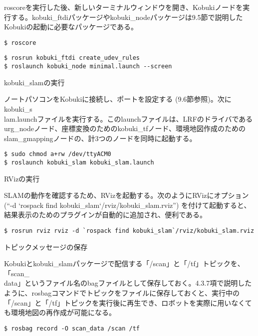roscoreを実行した後、新しいターミナルウィンドウを開き、Kobukiノードを実行する。kobuki\_ftdiパッケージやkobuki\_nodeパッケージは9.5節で説明したKobukiの起動に必要なパッケージである。

\begin{lstlisting}[language=ROS]
$ roscore
\end{lstlisting}

\begin{lstlisting}[language=ROS]
$ rosrun kobuki_ftdi create_udev_rules
$ roslaunch kobuki_node minimal.launch --screen
\end{lstlisting}

\circled{\thenum} kobuki\_slamの実行

ノートパソコンをKobukiに接続し、ポートを設定する (9.6節参照)。次にkobuki\_s\\lam.launchファイルを実行する。このlaunchファイルは、LRFのドライバであるurg\_nodeノード、座標変換のためのkobuki\_tfノード、環境地図作成のためのslam\_gmappingノードの、計3つのノードを同時に起動する。

\begin{lstlisting}[language=ROS]
$ sudo chmod a+rw /dev/ttyACM0
$ roslaunch kobuki_slam kobuki_slam.launch
\end{lstlisting}

\circled{\thenum} RVizの実行

SLAMの動作を確認するため、RVizを起動する。次のようにRVizにオプション (“-d `rospack find kobuki\_slam`/rviz/kobuki\_slam.rviz”)  を付けて起動すると、結果表示のためのプラグインが自動的に追加され、便利である。

\begin{lstlisting}[language=ROS]
$ rosrun rviz rviz -d `rospack find kobuki_slam`/rviz/kobuki_slam.rviz
\end{lstlisting}

\circled{\thenum} トピックメッセージの保存

Kobukiとkobuki\_slamパッケージで配信する「/scan」と「/tf」トピックを、「scan\_\\data」というファイル名のbagファイルとして保存しておく。4.3.7項で説明したように、rosbagコマンドでトピックをファイルに保存しておくと、実行中の「/scan」と「/tf」トピックを実行後に再生でき、ロボットを実際に用いなくても環境地図の再作成が可能になる。

\begin{lstlisting}[language=ROS]
$ rosbag record -O scan_data /scan /tf
\end{lstlisting}

